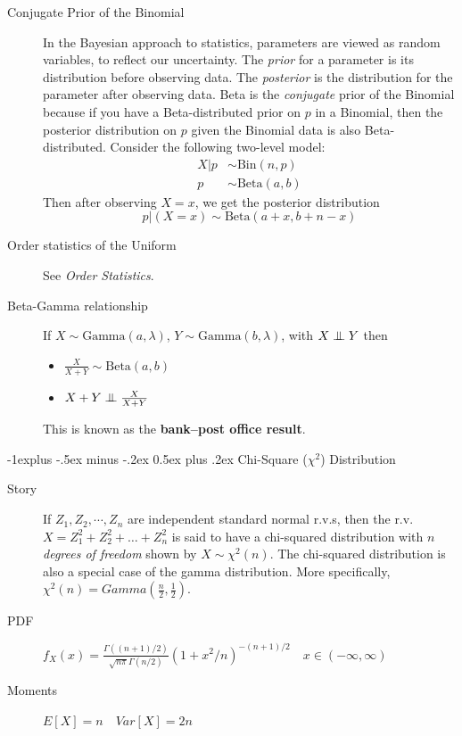 \documentclass[10pt,landscape]{article}
\makeatletter
\newcommand\independent{\protect\mathpalette{\protect\independenT}{\perp}}
\def\independenT#1#2{\mathrel{\setbox0\hbox{$#1#2$}%
    \copy0\kern-\wd0\mkern4mu\box0}}
\newcommand{\Bin}{\textrm{Bin}}
\newcommand{\Beta}{\textrm{Beta}}
\newcommand{\Gam}{\textrm{Gamma}}
\renewcommand{\subsection}{\@startsection{subsection}{2}{0mm}%
                                {-1explus -.5ex minus -.2ex}%
                                {0.5ex plus .2ex}%
                                {\normalfont\normalsize\bfseries}}
\makeatother
\begin{document}
\begin{multicols*}{3}
	\begin{description}
		\item[Conjugate Prior of the Binomial] In the Bayesian approach to statistics, parameters are viewed as random variables, to reflect our uncertainty. The \emph{prior} for a parameter is its distribution before observing data. The \emph{posterior}  is the distribution for the parameter after observing data. Beta is the \emph{conjugate} prior of the Binomial because if you have a Beta-distributed prior on $p$ in a Binomial, then the posterior distribution on $p$ given the Binomial data is also Beta-distributed. Consider the following two-level model:
		\begin{align*}
			X|p & \sim \Bin(n, p)  \\
			p   & \sim \Beta(a, b) 
		\end{align*}
		Then after observing  $X = x$, we get the posterior distribution
		\[p|(X=x) \sim \Beta(a + x, b + n - x) \]
												
		\item[Order statistics of the Uniform] See \emph{Order Statistics}.
		\item[Beta-Gamma relationship] If $X \sim \Gam(a, \lambda)$, $Y \sim \Gam(b, \lambda)$, with $X \independent Y$ then
		\begin{itemize}
			\item $\frac{X}{X + Y} \sim \Beta(a, b)$
			\item $X + Y \independent \frac{X}{X + Y}$
		\end{itemize}
		This is known as the \textbf{bank--post office result}.
	\end{description}
									
	\subsection{Chi-Square ($\chi^2$) Distribution}
	\begin{description}
		\item[Story] If $Z_1,Z_2,\cdots,Z_n$ are independent standard normal r.v.s, then the r.v. $X = Z_1^2 + Z_2^2 + \dots + Z_n^2$ is said to have a chi-squared distribution with $n$ \textit{degrees of freedom} shown by $X \sim \chi^2(n)$.  The chi-squared distribution is also a special case of the gamma distribution. More specifically, $\chi^2(n) = Gamma(\frac{n}{2}, \frac{1}{2})$.
		\item[PDF] $f_X(x) = \frac{\Gamma((n+1)/2)}{\sqrt{n\pi} \Gamma(n/2)} (1+x^2/n)^{-(n+1)/2} \quad x \in (-\infty, \infty)$
		\item[Moments] $E[X] = n \quad Var[X] = 2n$
	\end{description}
									

\end{multicols*}
\end{document}
